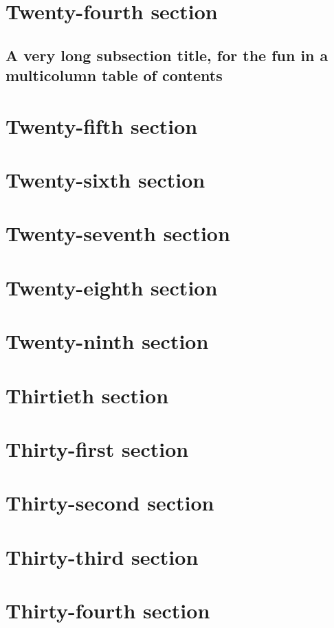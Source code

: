 \documentclass[oneside]{book}
\begin{document}
\begin{multicols}{2}
\section{Twenty-fourth section}   
\subsection{A very long subsection title, for the fun in
a multicolumn table of contents}  
\section{Twenty-fifth section}    
\section{Twenty-sixth section}    
\section{Twenty-seventh section}  
\section{Twenty-eighth section}   
\section{Twenty-ninth section}    
\section{Thirtieth section}       
\section{Thirty-first section}    
\section{Thirty-second section}   
\section{Thirty-third section}    
\section{Thirty-fourth section}   

\end{multicols}
\end{document}
